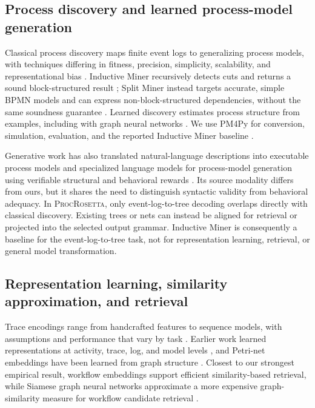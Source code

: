 \documentclass[pdflatex,sn-basic]{sn-jnl}
\newcommand{\model}{\textsc{ProcRosetta}\xspace}
\begin{document}
\subsection{Process discovery and learned process-model generation}

Classical process discovery maps finite event logs to generalizing process models, with techniques differing in fitness, precision, simplicity, scalability, and representational bias \citep{Augusto2019DiscoveryBenchmark}. Inductive Miner recursively detects cuts and returns a sound block-structured result \citep{Leemans2013}; Split Miner instead targets accurate, simple BPMN models and can express non-block-structured dependencies, without the same soundness guarantee \citep{Augusto2019SplitMiner}. Learned discovery estimates process structure from examples, including with graph neural networks \citep{Sommers2023}. We use PM4Py for conversion, simulation, evaluation, and the reported Inductive Miner baseline \citep{Berti2023PM4Py}.

Generative work has also translated natural-language descriptions into executable process models and specialized language models for process-model generation using verifiable structural and behavioral rewards \citep{Kourani2024LLMProcessModeling,Berti2025RLProcessModeling}. Its source modality differs from ours, but it shares the need to distinguish syntactic validity from behavioral adequacy. In \model, only event-log-to-tree decoding overlaps directly with classical discovery. Existing trees or nets can instead be aligned for retrieval or projected into the selected output grammar. Inductive Miner is consequently a baseline for the event-log-to-tree task, not for representation learning, retrieval, or general model transformation.

\subsection{Representation learning, similarity approximation, and retrieval}

Trace encodings range from handcrafted features to sequence models, with assumptions and performance that vary by task \citep{Barbon2023}. Earlier work learned representations at activity, trace, log, and model levels \citep{DeKoninck2018}, and Petri-net embeddings have been learned from graph structure \citep{Colonna2024}. Closest to our strongest empirical result, workflow embeddings support efficient similarity-based retrieval, while Siamese graph neural networks approximate a more expensive graph-similarity measure for workflow candidate retrieval \citep{Klein2019WorkflowEmbeddings,Hoffmann2020SiameseWorkflowRetrieval}.
\end{document}
